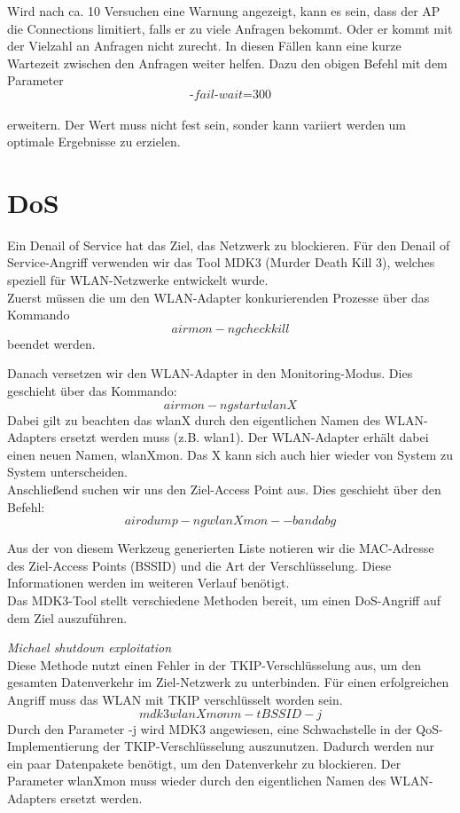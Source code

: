 Wird nach ca. 10 Versuchen eine Warnung angezeigt, kann es sein, dass der AP die Connections limitiert, falls er zu viele Anfragen bekommt. Oder er kommt mit der Vielzahl an Anfragen nicht zurecht. In diesen Fällen kann eine kurze Wartezeit zwischen den Anfragen weiter helfen. Dazu den obigen Befehl mit dem Parameter\\

$$\text{-}fail\text{-}wait\text{=}300$$\\

erweitern. Der Wert muss nicht fest sein, sonder kann variiert werden um optimale Ergebnisse zu erzielen. 

\section{DoS}
Ein Denail of Service hat das Ziel, das Netzwerk zu blockieren. 
Für den Denail of Service-Angriff verwenden wir das Tool MDK3 (Murder Death Kill 3), welches speziell für WLAN-Netzwerke entwickelt wurde. 
\\
Zuerst müssen die um den WLAN-Adapter konkurierenden Prozesse über das Kommando 
$$airmon-ng check kill$$
beendet werden. 

Danach versetzen wir den WLAN-Adapter in den Monitoring-Modus. Dies geschieht über das Kommando: 
$$airmon-ng start wlanX$$
Dabei gilt zu beachten das wlanX durch den eigentlichen Namen des WLAN-Adapters ersetzt werden muss (z.B. wlan1). 
Der WLAN-Adapter erhält dabei einen neuen Namen, wlanXmon. Das X kann sich auch hier wieder von System zu System unterscheiden. 
\\
Anschließend suchen wir uns den Ziel-Access Point aus. Dies geschieht über den Befehl: 
$$airodump-ng wlanXmon --band abg$$

Aus der von diesem Werkzeug generierten Liste notieren wir die MAC-Adresse des Ziel-Access Points (BSSID) und die Art der Verschlüsselung. Diese Informationen werden im weiteren Verlauf benötigt. 
\\
Das MDK3-Tool stellt verschiedene Methoden bereit, um einen DoS-Angriff auf dem Ziel auszuführen. 

\textit{Michael shutdown exploitation}\\
Diese Methode nutzt einen Fehler in der TKIP-Verschlüsselung aus, um den gesamten Datenverkehr im Ziel-Netzwerk zu unterbinden. Für einen erfolgreichen Angriff muss das WLAN mit TKIP verschlüsselt worden sein.\\
$$mdk3 wlanXmon m -t BSSID -j$$
Durch den Parameter -j wird MDK3 angewiesen, eine Schwachstelle in der QoS-Implementierung der TKIP-Verschlüsselung auszunutzen. Dadurch werden nur ein paar Datenpakete benötigt, um den Datenverkehr zu blockieren.
Der Parameter wlanXmon muss wieder durch den eigentlichen Namen des WLAN-Adapters ersetzt werden. 

